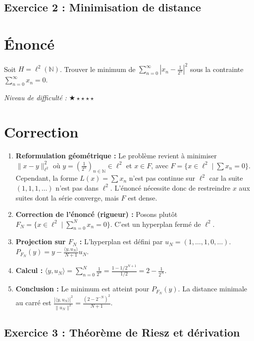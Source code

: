 \documentclass[11pt,a4paper]{article}
\begin{document}
\subsection*{Exercice 2 : Minimisation de distance}

\section{Énoncé}

Soit $H = \ell^2(\mathbb{N})$. Trouver le minimum de $\sum_{n=0}^\infty |x_n - \frac{1}{2^n}|^2$ sous la contrainte $\sum_{n=0}^\infty x_n = 0$.

\textit{Niveau de difficulté :} $\bigstar\star\star\star\star$

\section{Correction}

\begin{enumerate}
\item \textbf{Reformulation géométrique :} Le problème revient à minimiser $\|x - y\|_{\ell^2}^2$ où $y = (\frac{1}{2^n})_{n \in \mathbb{N}} \in \ell^2$ et $x \in F$, avec $F = \{ x \in \ell^2 \mid \sum x_n = 0\}$. Cependant, la forme $L(x) = \sum x_n$ n'est pas continue sur $\ell^2$ car la suite $(1, 1, 1, \dots)$ n'est pas dans $\ell^2$. L'énoncé nécessite donc de restreindre $x$ aux suites dont la série converge, mais $F$ est dense.
\item \textbf{Correction de l'énoncé (rigueur) :} Posons plutôt $F_N = \{ x \in \ell^2 \mid \sum_{n=0}^N x_n = 0\}$. C'est un hyperplan fermé de $\ell^2$.
\item \textbf{Projection sur $F_N$ :} L'hyperplan est défini par $u_N = (1, \dots, 1, 0, \dots)$. $P_{F_N}(y) = y - \frac{\langle y, u_N \rangle}{N+1} u_N$.
\item \textbf{Calcul :} $\langle y, u_N \rangle = \sum_{n=0}^N \frac{1}{2^n} = \frac{1 - 1/2^{N+1}}{1/2} = 2 - \frac{1}{2^N}$.
\item \textbf{Conclusion :} Le minimum est atteint pour $P_{F_N}(y)$. La distance minimale au carré est $\frac{|\langle y, u_N \rangle|^2}{\|u_N\|^2} = \frac{(2 - 2^{-N})^2}{N+1}$.
\end{enumerate}


\subsection*{Exercice 3 : Théorème de Riesz et dérivation}
\end{document}
